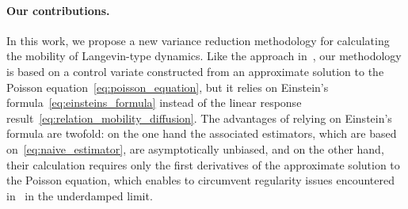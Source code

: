 \documentclass[11pt,a4paper]{article}
\begin{document}
\paragraph{Our contributions.}
In this work,
we propose a new variance reduction methodology for calculating the mobility of Langevin-type dynamics.
Like the approach in~\cite{roussel_thesis},
our methodology is based on a control variate constructed from an approximate solution to the Poisson equation~\eqref{eq:poisson_equation},
but it relies on Einstein's formula~\eqref{eq:einsteins_formula} instead of the linear response result~\eqref{eq:relation_mobility_diffusion}.
The advantages of relying on Einstein's formula are twofold:
on the one hand the associated estimators, which are based on~\eqref{eq:naive_estimator},
are asymptotically unbiased,
and on the other hand,
their calculation requires only the first derivatives of the approximate solution to the Poisson equation,
which enables to circumvent regularity issues encountered in~\cite{roussel_thesis} in the underdamped limit.

\end{document}
